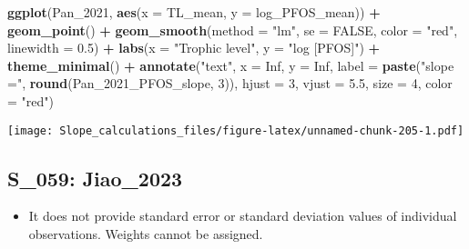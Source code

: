 \documentclass[
]{article}
\newenvironment{Shaded}{\begin{snugshade}}{\end{snugshade}}
\newcommand{\AttributeTok}[1]{\textcolor[rgb]{0.13,0.29,0.53}{#1}}
\newcommand{\ConstantTok}[1]{\textcolor[rgb]{0.56,0.35,0.01}{#1}}
\newcommand{\DecValTok}[1]{\textcolor[rgb]{0.00,0.00,0.81}{#1}}
\newcommand{\FloatTok}[1]{\textcolor[rgb]{0.00,0.00,0.81}{#1}}
\newcommand{\FunctionTok}[1]{\textcolor[rgb]{0.13,0.29,0.53}{\textbf{#1}}}
\newcommand{\NormalTok}[1]{#1}
\newcommand{\SpecialCharTok}[1]{\textcolor[rgb]{0.81,0.36,0.00}{\textbf{#1}}}
\newcommand{\StringTok}[1]{\textcolor[rgb]{0.31,0.60,0.02}{#1}}
\providecommand{\tightlist}{%
  \setlength{\itemsep}{0pt}\setlength{\parskip}{0pt}}
\begin{document}
\begin{Shaded}
\begin{Highlighting}[]
\FunctionTok{ggplot}\NormalTok{(Pan\_2021, }\FunctionTok{aes}\NormalTok{(}\AttributeTok{x =}\NormalTok{ TL\_mean, }\AttributeTok{y =}\NormalTok{ log\_PFOS\_mean)) }\SpecialCharTok{+}
  \FunctionTok{geom\_point}\NormalTok{() }\SpecialCharTok{+}
  \FunctionTok{geom\_smooth}\NormalTok{(}\AttributeTok{method =} \StringTok{"lm"}\NormalTok{, }\AttributeTok{se =} \ConstantTok{FALSE}\NormalTok{, }\AttributeTok{color =} \StringTok{"red"}\NormalTok{, }\AttributeTok{linewidth =} \FloatTok{0.5}\NormalTok{) }\SpecialCharTok{+}
  \FunctionTok{labs}\NormalTok{(}\AttributeTok{x =} \StringTok{"Trophic level"}\NormalTok{,}
       \AttributeTok{y =} \StringTok{"log [PFOS]"}\NormalTok{) }\SpecialCharTok{+}
  \FunctionTok{theme\_minimal}\NormalTok{() }\SpecialCharTok{+}
  \FunctionTok{annotate}\NormalTok{(}\StringTok{"text"}\NormalTok{, }\AttributeTok{x =} \ConstantTok{Inf}\NormalTok{, }\AttributeTok{y =} \ConstantTok{Inf}\NormalTok{, }\AttributeTok{label =} \FunctionTok{paste}\NormalTok{(}\StringTok{"slope ="}\NormalTok{, }\FunctionTok{round}\NormalTok{(Pan\_2021\_PFOS\_slope, }\DecValTok{3}\NormalTok{)), }
           \AttributeTok{hjust =} \DecValTok{3}\NormalTok{, }\AttributeTok{vjust =} \FloatTok{5.5}\NormalTok{, }\AttributeTok{size =} \DecValTok{4}\NormalTok{, }\AttributeTok{color =} \StringTok{"red"}\NormalTok{)}
\end{Highlighting}
\end{Shaded}

\texttt{[image: Slope\_calculations\_files/figure-latex/unnamed-chunk-205-1.pdf]}

\subsection{S\_059: Jiao\_2023}\label{s_059-jiao_2023-1}

\begin{itemize}
\tightlist
\item
  It does not provide standard error or standard deviation values of
  individual observations. Weights cannot be assigned.
\end{itemize}
\end{document}
